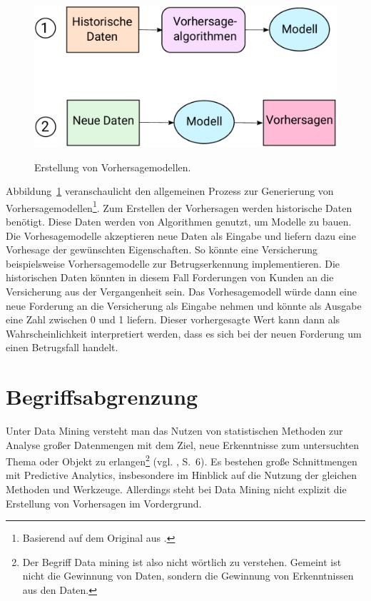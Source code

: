 \begin{figure}%
\centering
\caption{Erstellung von Vorhersagemodellen.}
\includegraphics[scale=0.8]{Grafiken/PA_Ink.pdf} 
\label{pic:PA}
\end{figure}
Abbildung~\ref{pic:PA} veranschaulicht den allgemeinen Prozess zur Generierung
von Vorhersagemodellen\footnote{
Basierend auf dem Original aus \cite{Parthasarathy}.
}.
Zum Erstellen der Vorhersagen werden historische Daten benötigt. Diese Daten
werden von Algorithmen genutzt, um Modelle zu bauen. Die Vorhesagemodelle
akzeptieren neue Daten als Eingabe und liefern dazu eine Vorhesage der
gewünschten Eigenschaften. So könnte eine Versicherung beispielsweise
Vorhersagemodelle zur Betrugserkennung implementieren. Die historischen Daten
könnten in diesem Fall Forderungen von Kunden an die Versicherung aus der
Vergangenheit sein. Das Vorhesagemodell würde dann eine neue Forderung an die
Versicherung als Eingabe nehmen und könnte als Ausgabe eine Zahl zwischen 0 und
1 liefern. Dieser vorhergesagte Wert kann dann als Wahrscheinlichkeit
interpretiert werden, dass es sich bei der neuen Forderung um einen Betrugsfall
handelt. 

\section{Begriffsabgrenzung}

Unter Data Mining versteht man das Nutzen von statistischen Methoden zur
Analyse großer Datenmengen mit dem Ziel, neue Erkenntnisse zum untersuchten 
Thema oder Objekt zu erlangen\footnote{
Der Begriff Data mining ist also nicht wörtlich zu verstehen. Gemeint ist
nicht die Gewinnung von Daten, sondern die Gewinnung von Erkenntnissen aus den
Daten.
}
(vgl. \cite{McCarthy}, S.~6). Es bestehen große Schnittmengen mit
Predictive Analytics, insbesondere im Hinblick auf die Nutzung der
gleichen Methoden und Werkzeuge. Allerdings steht bei Data Mining nicht
explizit die Erstellung von Vorhersagen im Vordergrund.

